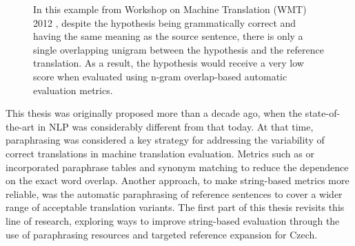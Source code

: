 \begin{figure}[tb]
\centering
\small
{}
\caption{In this example from  Workshop on Machine Translation (WMT) 2012 \citep{wmt12}, despite the hypothesis being grammatically correct and having the same meaning as the source sentence, there is only a single overlapping unigram between the hypothesis and the reference translation. As a result, the hypothesis would receive a very low score when evaluated using n-gram overlap-based automatic evaluation metrics.}
\label{example_of_BLEU_malfunction}
\end{figure}

This thesis was originally proposed more than a decade ago, when the state-of-the-art in NLP was considerably different from that today. At that time, paraphrasing was considered a key strategy for addressing the variability of correct translations in  machine translation evaluation. Metrics such as \mn \citep{denkowski-lavie-2014-meteor} or \terp \citep{terp}  incorporated paraphrase tables and synonym matching to reduce the dependence on the exact word overlap. Another approach, to make string-based metrics more reliable, was the automatic paraphrasing of reference sentences to cover a wider range of acceptable translation variants. The first part of this thesis revisits this line of research, exploring ways to improve string-based evaluation through the use of paraphrasing resources and targeted reference expansion for Czech.

